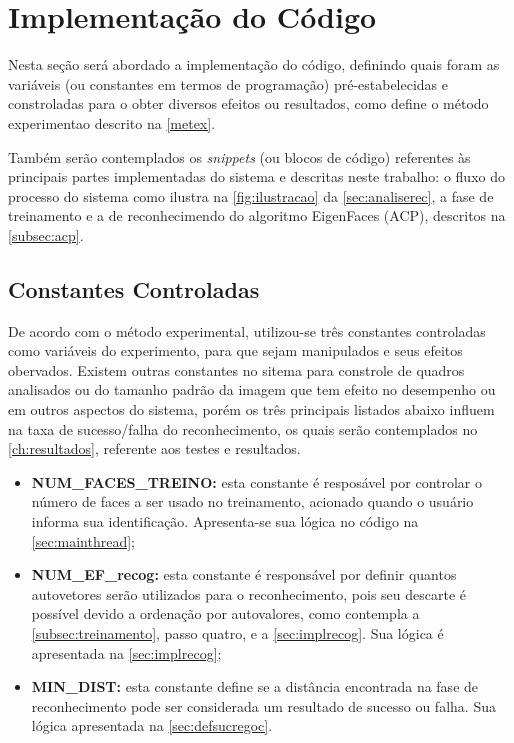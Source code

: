 \section{Implementação do Código}\label{sec:codigo}

Nesta seção será abordado a implementação do código, definindo quais foram as variáveis (ou constantes em termos de programação) pré-estabelecidas e constroladas para o obter diversos efeitos ou resultados, como define o método experimentao descrito na \autoref{metex}.

Também serão contemplados os \textit{snippets} (ou blocos de código) referentes às principais partes implementadas do sistema e descritas neste trabalho: o fluxo do processo do sistema como ilustra na \autoref{fig:ilustracao} da \autoref{sec:analiserec}, a fase de treinamento e a de reconhecimendo do algoritmo EigenFaces (ACP), descritos na \autoref{subsec:acp}.

\subsection{Constantes Controladas}\label{sec:consts}

De acordo com o método experimental, utilizou-se três constantes controladas como variáveis do experimento, para que sejam manipulados e seus efeitos obervados. Existem outras constantes no sitema para constrole de quadros analisados ou do tamanho padrão da imagem que tem efeito no desempenho ou em outros aspectos do sistema, porém os três principais listados abaixo influem na taxa de sucesso/falha do reconhecimento, os quais serão contemplados no \autoref{ch:resultados}, referente aos testes e resultados.

\begin{itemize}	
		\item \textbf{NUM\_FACES\_TREINO:} esta constante é resposável por controlar o número de faces a ser usado no treinamento, acionado quando o usuário informa sua identificação. Apresenta-se sua lógica no código na \autoref{sec:mainthread};
		
		\item \textbf{NUM\_EF\_recog:} esta constante é responsável por definir quantos autovetores serão utilizados para o reconhecimento, pois seu descarte é possível devido a ordenação por autovalores, como contempla a \autoref{subsec:treinamento}, passo quatro, e a \autoref{sec:implrecog}. Sua lógica é apresentada na \autoref{sec:implrecog};
		
		\item \textbf{MIN\_DIST:} esta constante define se a distância encontrada na fase de reconhecimento pode ser considerada um resultado de sucesso ou falha. Sua lógica apresentada na \autoref{sec:defsucregoc}.
\end{itemize}


